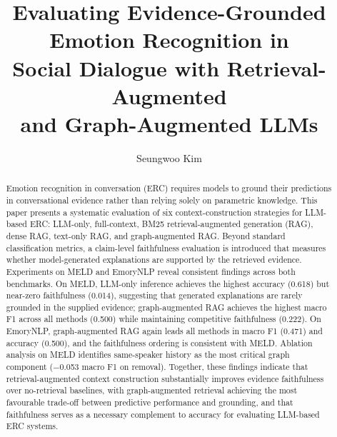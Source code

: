 \documentclass[runningheads]{llncs}
\begin{document}
\title{Evaluating Evidence-Grounded Emotion Recognition in\\
Social Dialogue with Retrieval-Augmented\\
and Graph-Augmented LLMs}


\author{Seungwoo Kim}


\maketitle

\begin{abstract}
Emotion recognition in conversation (ERC) requires models to ground their
predictions in conversational evidence rather than relying solely on
parametric knowledge. This paper presents a systematic evaluation of
six context-construction strategies for LLM-based ERC: LLM-only,
full-context, BM25 retrieval-augmented generation (RAG), dense RAG,
text-only RAG, and graph-augmented RAG. Beyond standard classification
metrics, a claim-level faithfulness evaluation is introduced that measures
whether model-generated explanations are supported by the retrieved
evidence. Experiments on MELD and EmoryNLP reveal consistent findings
across both benchmarks. On MELD, LLM-only inference achieves the
highest accuracy (0.618) but near-zero faithfulness (0.014), suggesting
that generated explanations are rarely grounded in the supplied evidence;
graph-augmented RAG achieves the highest macro F1 across all methods
(0.500) while maintaining competitive faithfulness (0.222). On EmoryNLP,
graph-augmented RAG again leads all methods in macro F1 (0.471) and
accuracy (0.500), and the faithfulness ordering is consistent with MELD.
Ablation analysis on MELD identifies same-speaker history as the most
critical graph component ($-$0.053 macro F1 on removal). Together,
these findings indicate that retrieval-augmented context construction
substantially improves evidence faithfulness over no-retrieval baselines,
with graph-augmented retrieval achieving the most favourable trade-off
between predictive performance and grounding, and that faithfulness
serves as a necessary complement to accuracy for evaluating LLM-based
ERC systems.

\end{abstract}
\end{document}
